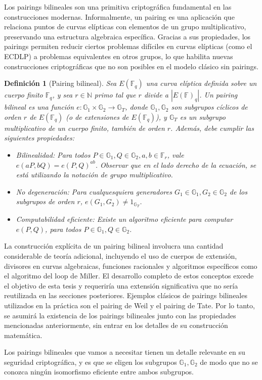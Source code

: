 \newtheorem{theorem}{Teorema}[chapter]
\newtheorem{definition}[theorem]{Definición}

Los pairings bilineales son una primitiva criptográfica fundamental en las construcciones modernas. Informalmente, un pairing es una aplicación que relaciona puntos de curvas elípticas con elementos de un grupo multiplicativo, preservando una estructura algebraica específica. Gracias a sus propiedades, los pairings permiten reducir ciertos problemas difíciles en curvas elípticas (como el ECDLP) a problemas equivalentes en otros grupos, lo que habilita nuevas construcciones criptográficas que no son posibles en el modelo clásico sin pairings.

\begin{definition}[Pairing bilineal]
	Sea $E(\mathbb{F}_q)$ una curva elíptica definida sobre un cuerpo finito $\mathbb{F}_q$, y sea $r \in \mathbb{N}$ primo tal que $r$ divide a $|E(\mathbb{F})_q|$. Un pairing bilineal es una función $e: \mathbb{G}_1 \times \mathbb{G}_2 \to \mathbb{G}_T$, donde $\mathbb{G}_1, \mathbb{G}_2$ son subgrupos cíclicos de orden $r$ de $E(\mathbb{F}_q)$ (o de extensiones de $E(\mathbb{F}_q)$), y $\mathbb{G}_T$ es un subgrupo multiplicativo de un cuerpo finito, también de orden $r$. Además, debe cumplir las siguientes propiedades:
	\begin{itemize}
		\item Bilinealidad: Para todos $P \in \mathbb{G}_1, Q \in \mathbb{G}_2, a, b \in \mathbb{F}_r$, vale $e(aP, bQ) = e(P, Q)^{ab}$. Observar que en el lado derecho de la ecuación, se está utilizando la notación de grupo multiplicativo.
		\item No degeneración: Para cualquesquiera generadores $G_1 \in \mathbb{G}_1, G_2 \in \mathbb{G}_2$ de los subgrupos de orden $r$, $e(G_1, G_2) \neq 1_{\mathbb{G}_T}$.
		\item Computabilidad eficiente: Existe un algoritmo eficiente para computar $e(P, Q)$, para todos $P \in \mathbb{G}_1, Q \in \mathbb{G}_2$.
	\end{itemize}
\end{definition}

La construcción explícita de un pairing bilineal involucra una cantidad considerable de teoría adicional, incluyendo el uso de cuerpos de extensión, divisores en curvas algebraicas, funciones racionales y algoritmos específicos como el algoritmo del loop de Miller. El desarrollo completo de estos conceptos excede el objetivo de esta tesis y requeriría una extensión significativa que no sería reutilizada en las secciones posteriores. Ejemplos clásicos de pairings bilineales utilizados en la práctica son el pairing de Weil y el pairing de Tate. Por lo tanto, se asumirá la existencia de los pairings bilineales junto con las propiedades mencionadas anteriormente, sin entrar en los detalles de su construcción matemática.

Los pairings bilineales que vamos a necesitar tienen un detalle relevante en su seguridad criptográfica, y es que se eligen los subgrupos $\mathbb{G}_1, \mathbb{G}_2$ de modo que no se conozca ningún isomorfismo eficiente entre ambos subgrupos.